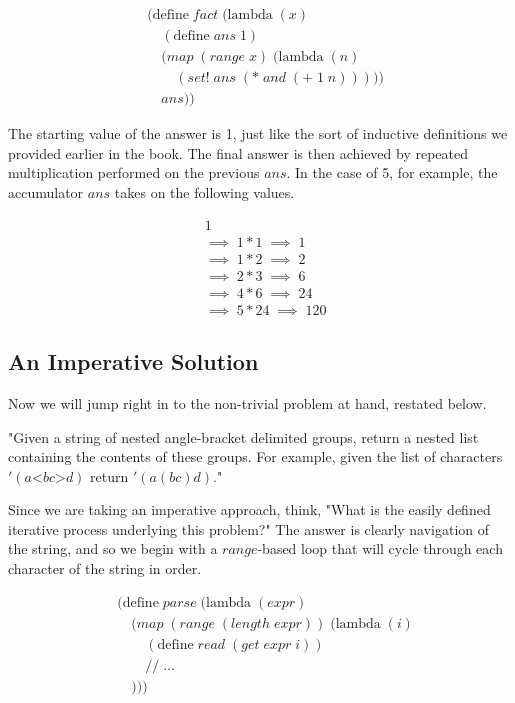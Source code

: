 \begin{figure}[ht]
\caption{}\label{scheme}
\begin{align*}
& (\text{define} \; fact \; (\text{lambda} \; (x)
\\& \quad (\text{define} \; ans \; 1)
\\& \quad (map \; (range \; x) \; (\text{lambda} \; (n)
\\& \qquad (set! \; ans \; (* \; and \; (+ \; 1 \; n)))))
\\& \quad ans))
\end{align*}
\end{figure}

The starting value of the answer is 1, just like the sort of inductive definitions we 
provided earlier in the book. The final answer is then achieved by repeated 
multiplication performed on the previous $ans$. In the case of 5, for example, the 
accumulator $ans$ takes on the following values.

\begin{figure}[ht]
\caption{}\label{}
\begin{align*}
& 1
\\& \implies \; 1*1 \; \implies \; 1
\\& \implies \; 1*2 \; \implies \; 2
\\& \implies \; 2*3 \; \implies \; 6
\\& \implies \; 4*6 \; \implies \; 24
\\& \implies \; 5*24 \; \implies \; 120
\end{align*}
\end{figure}

\subsection{An Imperative Solution}
Now we will jump right in to the non-trivial problem at hand, restated below.

"Given a string of nested angle-bracket delimited groups, return a
nested list containing the contents of these groups. For example,
given the list of characters $'(a \text{<} b c \text{>} d)$ return $'(a (b c) d)$."

Since we are taking an imperative approach, think, "What is the easily defined iterative 
process underlying this problem?" The answer is clearly navigation of the string, and so 
we begin with a $range$-based loop that will cycle through each character of the string 
in order.

\begin{figure}[ht]
\caption{}\label{scheme}
\begin{align*}
& (\text{define} \; parse \; (\text{lambda} \; (expr) \; 
\\& \quad (map \; (range \; (length \; expr)) \; (\text{lambda} \; (i)
\\& \qquad (\text{define} \; read \; (get \; expr \; i))
\\& \qquad // \; \dots
\\& \quad )))
\end{align*}
\end{figure}

